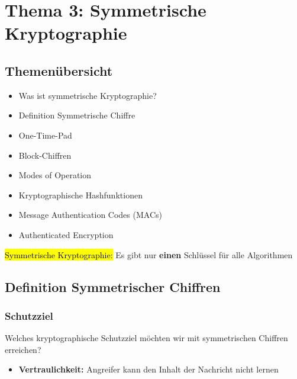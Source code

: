 \documentclass[a4paper, 10pt]{article}
\begin{document}
\section{Thema 3: Symmetrische Kryptographie}
\subsection{Themenübersicht}
\begin{itemize}
    \item Was ist symmetrische Kryptographie?
    \item Definition Symmetrische Chiffre
    \item One-Time-Pad
    \item Block-Chiffren
    \item Modes of Operation
    \item Kryptographische Hashfunktionen
    \item Message Authentication Codes (MACs)
    \item Authenticated Encryption 
\end{itemize}
\hl{Symmetrische Kryptographie:} Es gibt nur \textbf{einen} Schlüssel für alle Algorithmen
\subsection{Definition Symmetrischer Chiffren}
\subsubsection{Schutzziel}
Welches kryptographische Schutzziel möchten wir mit symmetrischen Chiffren erreichen?
\begin{itemize}
    \item \textbf{Vertraulichkeit:} Angreifer kann den Inhalt der Nachricht nicht lernen
\end{itemize}
\end{document}
